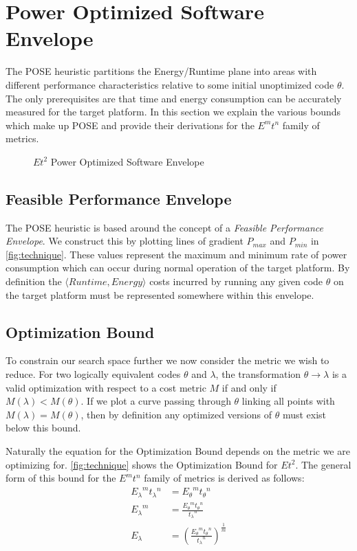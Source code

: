 \section{Power Optimized Software Envelope}
\label{sec:pose}
The POSE heuristic partitions the Energy/Runtime plane into areas with different performance characteristics relative to some initial unoptimized code $\theta$. The only prerequisites are that time and energy consumption can be accurately measured for the target platform.
In this section we explain the various bounds which make up POSE and provide their derivations for the $E^mt^n$ family of metrics.

\begin{figure}
\centering

\caption{$Et^2$ Power Optimized Software Envelope}
\label{fig:technique}
\end{figure}

\subsection{Feasible Performance Envelope}
The POSE heuristic is based around the concept of a \emph{Feasible Performance Envelope}.
We construct this by plotting lines of gradient $P_{max}$ and $P_{min}$ in \autoref{fig:technique}.
These values represent the maximum and minimum rate of power consumption which can occur during normal operation of the target platform.
By definition the $\langle Runtime, Energy\rangle$ costs incurred by running any given code $\theta$ on the target platform must be represented somewhere within this envelope.

\subsection{Optimization Bound}
To constrain our search space further we now consider the metric we wish to reduce.
For two logically equivalent codes $\theta$ and $\lambda$, the transformation ${\theta \to \lambda}$ is a valid optimization with respect to a cost metric $M$ if and only if ${M(\lambda) < M(\theta)}$.
If we plot a curve passing through $\theta$ linking all points with ${M(\lambda) = M(\theta)}$, then by definition any optimized versions of $\theta$ must exist below this bound.

Naturally the equation for the Optimization Bound depends on the metric we are optimizing for.
\autoref{fig:technique} shows the Optimization Bound for $Et^2$.
The general form of this bound for the $E^mt^n$ family of metrics is derived as follows:
\begin{align}
 {E_\lambda}^m{t_\lambda}^n &= {E_\theta}^m{t_\theta}^n \nonumber \\
 {E_\lambda}^m &= \frac{{E_\theta}^m{t_\theta}^n}{{t_\lambda}^n} \nonumber \\
  E_\lambda &= (\frac{{E_\theta}^m{t_\theta}^n}{{t_\lambda}^n})^\frac{1}{m}
\label{eq:optimization}
\end{align}

